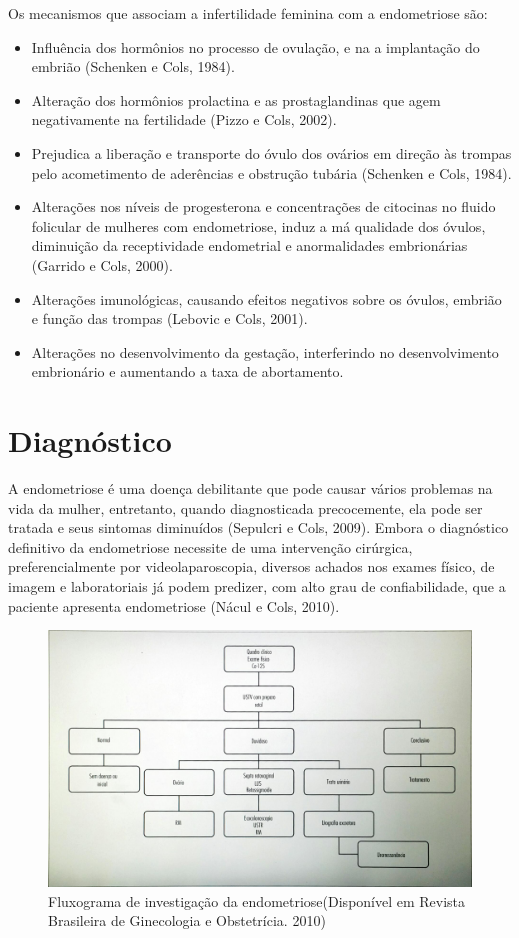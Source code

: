 \documentclass[12pt]{article} %
\begin{document}
Os mecanismos que associam a infertilidade feminina com a endometriose são:

\begin{itemize}
\item Influência dos hormônios no processo de ovulação, e na a implantação do embrião (Schenken e Cols, 1984).
\item Alteração dos hormônios prolactina e as prostaglandinas que agem negativamente na fertilidade (Pizzo e Cols, 2002).
\item Prejudica a liberação e transporte do óvulo dos ovários em direção às trompas pelo acometimento de aderências e obstrução tubária (Schenken e Cols, 1984).
\item Alterações nos níveis de progesterona e concentrações de citocinas no fluido folicular de mulheres com endometriose, induz a má qualidade dos óvulos, diminuição da receptividade endometrial e anormalidades embrionárias (Garrido e Cols, 2000).
\item Alterações imunológicas, causando efeitos negativos sobre os óvulos, embrião e função das trompas (Lebovic e Cols, 2001).
\item Alterações no desenvolvimento da gestação, interferindo no desenvolvimento embrionário e aumentando a taxa de abortamento.
\end{itemize}


\section{Diagnóstico}


A endometriose é uma doença debilitante que pode causar vários
problemas na vida da mulher, entretanto, quando diagnosticada
precocemente, ela pode ser tratada e seus sintomas diminuídos (Sepulcri e Cols, 2009).  Embora
o diagnóstico definitivo da endometriose necessite de uma intervenção
cirúrgica, preferencialmente por videolaparoscopia, diversos achados
nos exames físico, de imagem e laboratoriais já podem predizer, com
alto grau de confiabilidade, que a paciente apresenta endometriose (Nácul e Cols, 2010).

\begin{figure}[h!]
\centering
\includegraphics[width=14cm]{tabela.png}
\caption[Fluxograma de investigação da endometriose]{Fluxograma de investigação da endometriose(Disponível em Revista Brasileira de Ginecologia e Obstetrícia. 2010)}
\end{figure}
\end{document}
